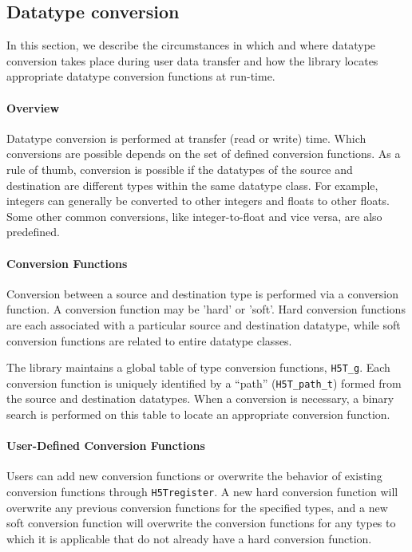 \subsection{Datatype conversion}\label{sec:dtype-conv}

In this section, we describe the circumstances in which and where datatype conversion takes place during user data transfer and how the library locates appropriate datatype conversion functions at run-time.

\paragraph{Overview} Datatype conversion is performed at transfer (read or write) time. Which conversions are possible depends on the set of defined conversion functions. As a rule of thumb, conversion is possible if the datatypes of the source and destination are different types within the same datatype class. For example, integers can generally be converted to other integers and floats to other floats. Some other common conversions, like integer-to-float and vice versa, are also predefined.

\paragraph{Conversion Functions} Conversion between a source and destination type is performed via a conversion function. A conversion function may be 'hard' or 'soft'. Hard conversion functions are each associated with a particular source and destination datatype, while soft conversion functions are related to entire datatype classes. 

The library maintains a global table of type conversion functions, \texttt{H5T\_g}. Each conversion function is uniquely identified by a ``path'' (\texttt{H5T\_path\_t}) formed from the source and destination datatypes. When a conversion is necessary, a binary search is performed on this table to locate an appropriate conversion function. 

\paragraph{User-Defined Conversion Functions} Users can add new conversion functions or overwrite the behavior of existing conversion functions through \texttt{H5Tregister}. A new hard conversion function will overwrite any previous conversion functions for the specified types, and a new soft conversion function will overwrite the conversion functions for any types to which it is applicable that do not already have a hard conversion function.

